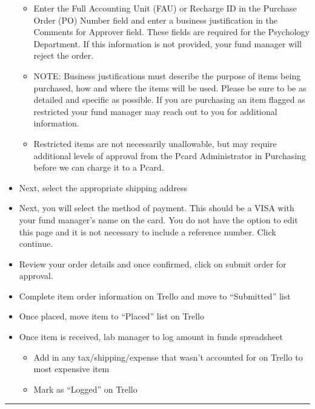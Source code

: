 \documentclass[]{book}
\providecommand{\tightlist}{%
  \setlength{\itemsep}{0pt}\setlength{\parskip}{0pt}}
\begin{document}
\begin{itemize}
  \begin{itemize}
  \tightlist
  \item
    Enter the Full Accounting Unit (FAU) or Recharge ID in the Purchase
    Order (PO) Number field and enter a business justification in the
    Comments for Approver field. These fields are required for the
    Psychology Department. If this information is not provided, your
    fund manager will reject the order.
  \item
    NOTE: Business justifications must describe the purpose of items
    being purchased, how and where the items will be used. Please be
    sure to be as detailed and specific as possible. If you are
    purchasing an item flagged as restricted your fund manager may reach
    out to you for additional information.\\
  \item
    Restricted items are not necessarily unallowable, but may require
    additional levels of approval from the Pcard Administrator in
    Purchasing before we can charge it to a Pcard.
  \end{itemize}
\item
  Next, select the appropriate shipping address
\item
  Next, you will select the method of payment. This should be a VISA
  with your fund manager's name on the card. You do not have the option
  to edit this page and it is not necessary to include a reference
  number. Click continue.
\item
  Review your order details and once confirmed, click on submit order
  for approval.
\item
  Complete item order information on Trello and move to ``Submitted''
  list
\item
  Once placed, move item to ``Placed'' list on Trello
\item
  Once item is received, lab manager to log amount in funds spreadsheet

  \begin{itemize}
  \tightlist
  \item
    Add in any tax/shipping/expense that wasn't accounted for on Trello
    to most expensive item
  \item
    Mark as ``Logged'' on Trello
  \end{itemize}
\end{itemize}

\begin{center}\rule{0.5\linewidth}{0.5pt}\end{center}
\end{document}
